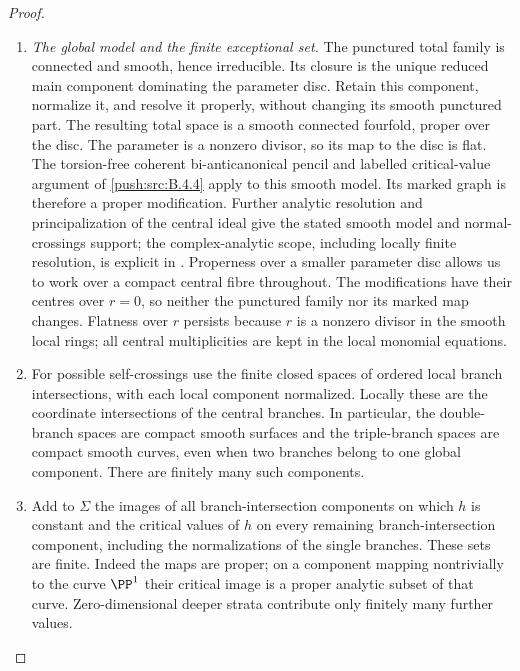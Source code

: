 \begin{proof}
\begin{enumerate}[label=\arabic*.,leftmargin=*]
\item \emph{The global model and the finite exceptional set.}
The punctured total family is connected and smooth, hence
irreducible. Its closure is the unique reduced main component
dominating the parameter disc. Retain this component, normalize
it, and resolve it properly, without changing its smooth
punctured part. The resulting total space is a smooth connected
fourfold, proper over the disc. The parameter is a nonzero
divisor, so its map to the disc is flat. The torsion-free coherent bi-anticanonical pencil and labelled
critical-value argument of \ref{push:src:B.4.4} apply to this smooth model.
Its marked graph is therefore a proper modification.
Further analytic resolution and principalization of the central
ideal give the stated smooth
model and normal-crossings support; the complex-analytic scope,
including locally finite resolution, is explicit in
\citet[Theorems~1.6 and 1.10, pp.~215--216, including the noncompact extension after Theorem~1.6]{BM97}. Properness over a smaller parameter disc
allows us to work over a compact central fibre throughout.
The modifications have their centres over $r=0$, so neither
the punctured family nor its marked map changes.
Flatness over $r$ persists because $r$ is a nonzero divisor in
the smooth local rings; all central multiplicities are kept in the
local monomial equations.

\item For possible self-crossings use the finite closed spaces of
ordered local branch intersections, with each local component
normalized. Locally these are the coordinate intersections of
the central branches. In particular, the double-branch spaces
are compact smooth surfaces and the triple-branch spaces are
compact smooth curves, even when two branches belong to one
global component. There are finitely many such components.

\item Add to $\Sigma$ the images of all branch-intersection components
on which $h$ is constant and the critical values of $h$ on every
remaining branch-intersection component, including the
normalizations of the single branches. These sets are finite.
Indeed the maps are proper; on a component mapping nontrivially
to the curve $\PP^1$ their critical image is a proper analytic
subset of that curve. Zero-dimensional deeper strata contribute
only finitely many further values.


\end{enumerate}
\end{proof}
